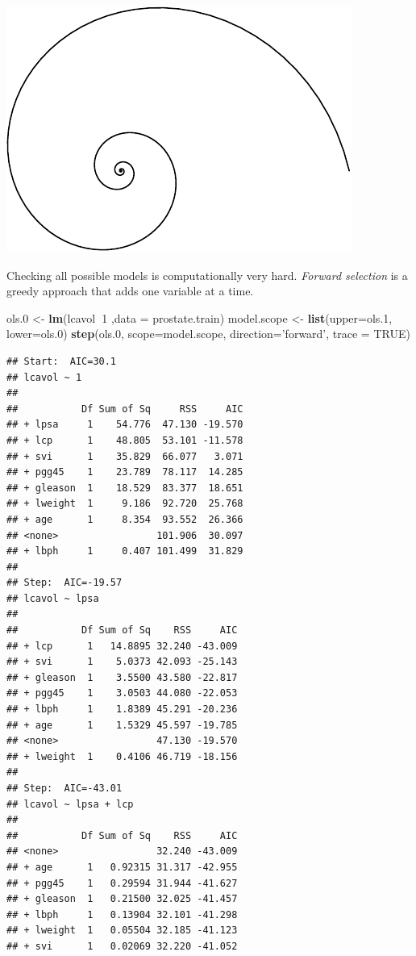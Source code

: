 \documentclass[]{book}
\newenvironment{Shaded}{\begin{snugshade}}{\end{snugshade}}
\newcommand{\DataTypeTok}[1]{\textcolor[rgb]{0.13,0.29,0.53}{#1}}
\newcommand{\DecValTok}[1]{\textcolor[rgb]{0.00,0.00,0.81}{#1}}
\newcommand{\FloatTok}[1]{\textcolor[rgb]{0.00,0.00,0.81}{#1}}
\newcommand{\KeywordTok}[1]{\textcolor[rgb]{0.13,0.29,0.53}{\textbf{#1}}}
\newcommand{\NormalTok}[1]{#1}
\newcommand{\OperatorTok}[1]{\textcolor[rgb]{0.81,0.36,0.00}{\textbf{#1}}}
\newcommand{\OtherTok}[1]{\textcolor[rgb]{0.56,0.35,0.01}{#1}}
\newcommand{\StringTok}[1]{\textcolor[rgb]{0.31,0.60,0.02}{#1}}
\theoremstyle{definition}
\theoremstyle{definition}
\theoremstyle{definition}
\theoremstyle{remark}
\begin{document}
\includegraphics[width=0.5\linewidth]{Rcourse_files/figure-latex/unnamed-chunk-227-1}

Checking all possible models is computationally very hard.
\emph{Forward selection} is a greedy approach that adds one variable at a time.

\begin{Shaded}
\begin{Highlighting}[]
\NormalTok{ols}\FloatTok{.0}\NormalTok{ <-}\StringTok{ }\KeywordTok{lm}\NormalTok{(lcavol}\OperatorTok{~}\DecValTok{1}\NormalTok{ ,}\DataTypeTok{data =}\NormalTok{ prostate.train)}
\NormalTok{model.scope <-}\StringTok{ }\KeywordTok{list}\NormalTok{(}\DataTypeTok{upper=}\NormalTok{ols}\FloatTok{.1}\NormalTok{, }\DataTypeTok{lower=}\NormalTok{ols}\FloatTok{.0}\NormalTok{)}
\KeywordTok{step}\NormalTok{(ols}\FloatTok{.0}\NormalTok{, }\DataTypeTok{scope=}\NormalTok{model.scope, }\DataTypeTok{direction=}\StringTok{'forward'}\NormalTok{, }\DataTypeTok{trace =} \OtherTok{TRUE}\NormalTok{)}
\end{Highlighting}
\end{Shaded}

\begin{verbatim}
## Start:  AIC=30.1
## lcavol ~ 1
## 
##           Df Sum of Sq     RSS     AIC
## + lpsa     1    54.776  47.130 -19.570
## + lcp      1    48.805  53.101 -11.578
## + svi      1    35.829  66.077   3.071
## + pgg45    1    23.789  78.117  14.285
## + gleason  1    18.529  83.377  18.651
## + lweight  1     9.186  92.720  25.768
## + age      1     8.354  93.552  26.366
## <none>                 101.906  30.097
## + lbph     1     0.407 101.499  31.829
## 
## Step:  AIC=-19.57
## lcavol ~ lpsa
## 
##           Df Sum of Sq    RSS     AIC
## + lcp      1   14.8895 32.240 -43.009
## + svi      1    5.0373 42.093 -25.143
## + gleason  1    3.5500 43.580 -22.817
## + pgg45    1    3.0503 44.080 -22.053
## + lbph     1    1.8389 45.291 -20.236
## + age      1    1.5329 45.597 -19.785
## <none>                 47.130 -19.570
## + lweight  1    0.4106 46.719 -18.156
## 
## Step:  AIC=-43.01
## lcavol ~ lpsa + lcp
## 
##           Df Sum of Sq    RSS     AIC
## <none>                 32.240 -43.009
## + age      1   0.92315 31.317 -42.955
## + pgg45    1   0.29594 31.944 -41.627
## + gleason  1   0.21500 32.025 -41.457
## + lbph     1   0.13904 32.101 -41.298
## + lweight  1   0.05504 32.185 -41.123
## + svi      1   0.02069 32.220 -41.052
\end{verbatim}
\end{document}

